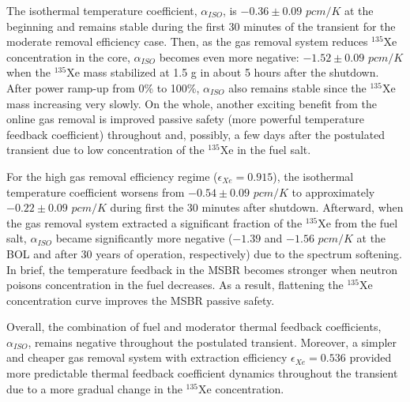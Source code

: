 The isothermal temperature coefficient, $\alpha_{ISO}$, is $-0.36\pm0.09$ 
$pcm/K$ at the beginning and remains stable during the first 30 minutes of the 
transient for the moderate removal efficiency case.  Then, as the gas removal 
system reduces $^{135}$Xe concentration in the core, $\alpha_{ISO}$ becomes 
even more negative: $-1.52\pm0.09$ $pcm/K$ when the $^{135}$Xe mass stabilized 
at 1.5 g in about 5 hours after the shutdown. After power ramp-up from 0\% to 
100\%, $\alpha_{ISO}$ also remains stable since the $^{135}$Xe mass increasing 
very slowly. On the whole, another exciting benefit from the online gas 
removal is improved passive safety (more powerful temperature feedback 
coefficient) throughout and, possibly, a few days after the postulated 
transient due to low concentration of the $^{135}$Xe in the fuel salt.

For the high gas removal efficiency regime ($\epsilon_{Xe}=0.915$), the 
isothermal temperature coefficient worsens from $-0.54\pm0.09$ $pcm/K$ to 
approximately $-0.22\pm0.09$ $pcm/K$ during first the 30 minutes after 
shutdown. 
Afterward, when the gas removal system extracted a significant fraction of the 
$^{135}$Xe from the fuel salt, $\alpha_{ISO}$ became significantly more 
negative ($-1.39$ and $-1.56$ $pcm/K$ at the \gls{BOL} and after 30 years of 
operation, respectively) due to the spectrum softening. In brief, the 
temperature feedback in the \gls{MSBR} becomes stronger when neutron poisons 
concentration in the fuel decreases. As a result, flattening the $^{135}$Xe 
concentration curve improves the \gls{MSBR} passive safety.

Overall, the combination of fuel and moderator thermal feedback coefficients, 
$\alpha_{ISO}$, remains negative throughout the postulated transient. 
Moreover, a simpler and cheaper gas removal system with extraction 
efficiency $\epsilon_{Xe}=0.536$ provided more predictable thermal feedback 
coefficient dynamics throughout the transient due to 
a more gradual change in the $^{135}$Xe concentration.

